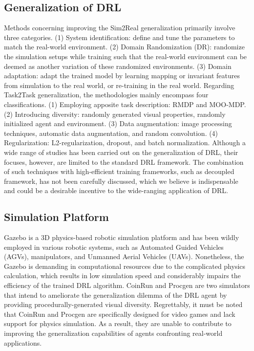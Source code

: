 \documentclass[journal]{IEEEtran}
\begin{document}
\subsection{Generalization of DRL}
Methods concerning improving the Sim2Real generalization primarily involve three categories. (1) System identification\cite{SI}: define and tune the parameters to match the real-world environment. (2) Domain Randomization (DR)\cite{DR}: randomize the simulation setups while training such that the real-world environment can be deemed as another variation of these randomized environments. (3) Domain adaptation\cite{DualDA,S2R_survey}: adapt the trained model by learning mapping or invariant features from simulation to the real world, or re-training in the real world. Regarding Task2Task generalization, the methodologies mainly encompass four classifications. (1) Employing apposite task description: RMDP\cite{RMDP} and MOO-MDP\cite{MOO-MDP}. (2) Introducing diversity: randomly generated visual properties\cite{Procgen}, randomly initialized agent and environment\cite{LiZhi}. (3) Data augmentation: image processing techniques\cite{DA_img}, automatic data augmentation\cite{ADA}, and random convolution\cite{RandomConv}. (4) Regularization\cite{CoinRun}: L2-regularization, dropout, and batch normalization. Although a wide range of studies has been carried out on the generalization of DRL, their focuses, however, are limited to the standard DRL framework. The combination of such techniques with high-efficient training frameworks, such as decoupled framework, has not been carefully discussed, which we believe is indispensable and could be a desirable incentive to the wide-ranging application of DRL.

\subsection{Simulation Platform}
Gazebo\cite{gazebo} is a 3D physics-based robotic simulation platform and has been wildly employed in various robotic systems, such as Automated Guided Vehicles (AGVs)\cite{LiZhi}, manipulators\cite{manipulator}, and Unmanned Aerial Vehicles (UAVs)\cite{UAVs}. Nonetheless, the Gazebo is demanding in computational resources due to the complicated physics calculation, which results in low simulation speed and considerably impairs the efficiency of the trained DRL algorithm\cite{Gazebo_slow1,Gazebo_slow2,Gazebo_slow3}. CoinRun\cite{CoinRun} and Procgen\cite{Procgen} are two simulators that intend to ameliorate the generalization dilemma of the DRL agent by providing procedurally-generated visual diversity. Regrettably, it must be noted that CoinRun and Procgen are specifically designed for video games and lack support for physics simulation. As a result, they are unable to contribute to improving the generalization capabilities of agents confronting real-world applications.
\end{document}
